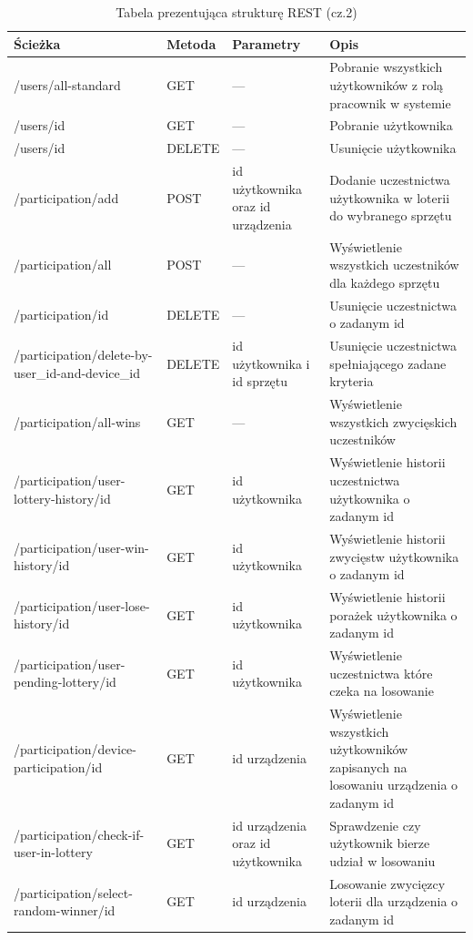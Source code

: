 \begin{table}[H] \small
	\centering
\caption{Tabela prezentująca strukturę REST (cz.2)}
\label{tab:rest2}	 
\begin{tabularx}{\linewidth}{|X|l|p{3cm}|X|}\hline
    Ścieżka & Metoda & Parametry & Opis  \\
    \hline \hline
		 /users/all-standard	& GET & --- & Pobranie wszystkich użytkowników z rolą pracownik w systemie\\
		\hline
		 /users/id & GET & --- & Pobranie użytkownika\\
		\hline
		 /users/id & DELETE & --- & Usunięcie użytkownika\\
		\hline
		 /participation/add & POST & id użytkownika oraz id urządzenia & Dodanie uczestnictwa użytkownika w loterii do wybranego sprzętu\\
		\hline
		 /participation/all& POST & --- & Wyświetlenie wszystkich uczestników dla każdego sprzętu\\
		\hline
		 /participation/id & DELETE & --- & Usunięcie uczestnictwa o zadanym id\\
		\hline
		 /participation/delete-by-user\_id-and-device\_id& DELETE & id użytkownika i id sprzętu & Usunięcie uczestnictwa spełniającego zadane kryteria\\
		\hline
		 /participation/all-wins& GET & --- & Wyświetlenie wszystkich zwycięskich uczestników\\
		\hline
		 /participation/user-lottery-history/id & GET& id użytkownika & Wyświetlenie historii uczestnictwa użytkownika o zadanym id\\
		\hline
		 /participation/user-win-history/id & GET& id użytkownika & Wyświetlenie historii zwycięstw użytkownika o zadanym id\\
		\hline
		 /participation/user-lose-history/id & GET& id użytkownika & Wyświetlenie historii porażek użytkownika o zadanym id\\
		\hline
		 /participation/user-pending-lottery/id & GET& id użytkownika & Wyświetlenie uczestnictwa które czeka na losowanie\\
		\hline
		 /participation/device-participation/id& GET& id urządzenia & Wyświetlenie wszystkich użytkowników zapisanych na losowaniu urządzenia o zadanym id\\
		\hline
		 /participation/check-if-user-in-lottery& GET& id urządzenia oraz id użytkownika& Sprawdzenie czy użytkownik bierze udział w losowaniu\\
		\hline
		 /participation/select-random-winner/id& GET& id urządzenia& Losowanie zwycięzcy loterii dla urządzenia o zadanym id\\
		\hline
\end{tabularx}
\end{table}



